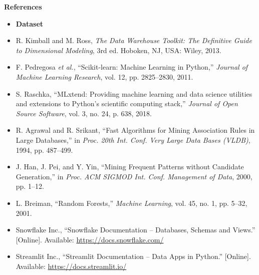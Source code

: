 \documentclass[12pt, a4paper]{report}
\begin{document}
\clearpage
{}
{}
\begin{center}
    {\huge \textbf{References}}\\[1cm]
\end{center}

\begin{itemize}[leftmargin=1.5cm, label={}, itemsep=0.8cm]
    \item[\textbf{R1}] \textbf{Dataset}
    \item[\textbf{R2}] R. Kimball and M. Ross, \textit{The Data Warehouse Toolkit: The Definitive Guide to Dimensional Modeling}, 3rd ed. Hoboken, NJ, USA: Wiley, 2013.
    \item[\textbf{R3}] F. Pedregosa \textit{et al.}, ``Scikit-learn: Machine Learning in Python,'' \textit{Journal of Machine Learning Research}, vol. 12, pp. 2825--2830, 2011.
    \item[\textbf{R4}] S. Raschka, ``MLxtend: Providing machine learning and data science utilities and extensions to Python's scientific computing stack,'' \textit{Journal of Open Source Software}, vol. 3, no. 24, p. 638, 2018.
    \item[\textbf{R5}] R. Agrawal and R. Srikant, ``Fast Algorithms for Mining Association Rules in Large Databases,'' in \textit{Proc. 20th Int. Conf. Very Large Data Bases (VLDB)}, 1994, pp. 487--499.
    \item[\textbf{R6}] J. Han, J. Pei, and Y. Yin, ``Mining Frequent Patterns without Candidate Generation,'' in \textit{Proc. ACM SIGMOD Int. Conf. Management of Data}, 2000, pp. 1--12.
    \item[\textbf{R7}] L. Breiman, ``Random Forests,'' \textit{Machine Learning}, vol. 45, no. 1, pp. 5--32, 2001.
    \item[\textbf{R8}] Snowflake Inc., ``Snowflake Documentation -- Databases, Schemas and Views.'' [Online]. Available: \url{https://docs.snowflake.com/}
    \item[\textbf{R9}] Streamlit Inc., ``Streamlit Documentation -- Data Apps in Python.'' [Online]. Available: \url{https://docs.streamlit.io/}
\end{itemize}
\end{document}
